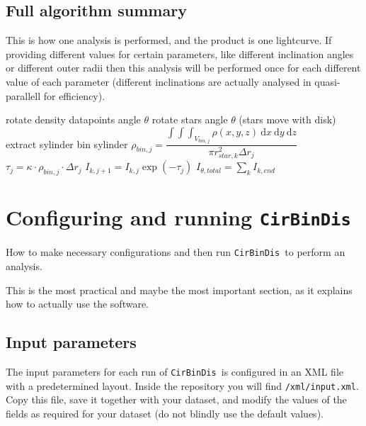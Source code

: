 \documentclass[a4paper, 12pt, english, titlepage]{article}
\newcommand{\D}[1]{\ \mathrm{d}#1} %
\newcommand{\sname}{\texttt{CirBinDis }}
\begin{document}
\subsection{Full algorithm summary}
    \label{sec:algorithm_summary}
    This is how one analysis is performed, and the product is one lightcurve. If providing different values for certain parameters, like different inclination angles or different outer radii then this analysis will be performed once for each different value of each parameter (different inclinations are actually analysed in quasi-parallell for efficiency).
    \begin{algorithmic}
            \STATE rotate density datapoints angle $\theta$
            \STATE rotate stars angle $\theta$ (stars move with disk)
                \STATE extract sylinder
                \STATE bin sylinder
                    \STATE $\rho_{bin,j} =
                        \dfrac{\int\int\int_{V_{bin,j}} \rho(x,y,z) \D{x}\D{y}\D{z}}
                        {\pi r_{star,k}^2 \Delta r_j}$
                    \STATE $\tau_j = \kappa \cdot \rho_{bin,j} \cdot \Delta r_j$
                    \STATE $I_{k,j+1} = I_{k,j} \exp(-\tau_j)$
                \ENDFOR
            \ENDFOR
            \STATE $I_{\theta,total} = \sum_k I_{k,end}$
        \ENDFOR
    \end{algorithmic}




\section{Configuring and running \sname}

How to make necessary configurations and then run \sname to perform an analysis.

This is the most practical and maybe the most important section, as it explains how to actually use the software.

\subsection{Input parameters}
    \label{sec:input}

    The input parameters for each run of \sname is configured in an XML file with a predetermined layout.
    Inside the repository you will find \texttt{/xml/input.xml}. Copy this file, save it together with your dataset, and modify the values of the fields as required for your dataset (do not blindly use the default values).
\end{document}
